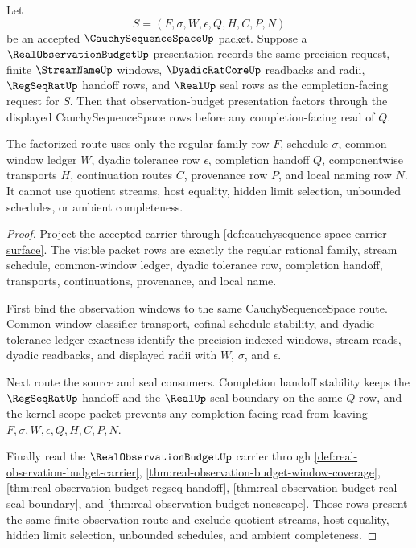 \begin{theorem}
\label{thm:cauchysequence-space-real-observation-budget-factorization}
Let
$$
S=(F,\sigma,W,\epsilon,Q,H,C,P,N)
$$
be an accepted $\CauchySequenceSpaceUp$ packet. Suppose a $\RealObservationBudgetUp$ presentation records the same precision request, finite $\StreamNameUp$ windows, $\DyadicRatCoreUp$ readbacks and radii, $\RegSeqRatUp$ handoff rows, and $\RealUp$ seal rows as the completion-facing request for $S$. Then that observation-budget presentation factors through the displayed CauchySequenceSpace rows before any completion-facing read of $Q$.

The factorized route uses only the regular-family row $F$, schedule $\sigma$, common-window ledger $W$, dyadic tolerance row $\epsilon$, completion handoff $Q$, componentwise transports $H$, continuation routes $C$, provenance row $P$, and local naming row $N$. It cannot use quotient streams, host equality, hidden limit selection, unbounded schedules, or ambient completeness.
\end{theorem}
\begin{proof}
Project the accepted carrier through \autoref{def:cauchysequence-space-carrier-surface}. The visible packet rows are exactly the regular rational family, stream schedule, common-window ledger, dyadic tolerance row, completion handoff, transports, continuations, provenance, and local name.

First bind the observation windows to the same CauchySequenceSpace route. Common-window classifier transport, cofinal schedule stability, and dyadic tolerance ledger exactness identify the precision-indexed windows, stream reads, dyadic readbacks, and displayed radii with $W$, $\sigma$, and $\epsilon$.

Next route the source and seal consumers. Completion handoff stability keeps the $\RegSeqRatUp$ handoff and the $\RealUp$ seal boundary on the same $Q$ row, and the kernel scope packet prevents any completion-facing read from leaving $F,\sigma,W,\epsilon,Q,H,C,P,N$.

Finally read the $\RealObservationBudgetUp$ carrier through \autoref{def:real-observation-budget-carrier}, \autoref{thm:real-observation-budget-window-coverage}, \autoref{thm:real-observation-budget-regseq-handoff}, \autoref{thm:real-observation-budget-real-seal-boundary}, and \autoref{thm:real-observation-budget-nonescape}. Those rows present the same finite observation route and exclude quotient streams, host equality, hidden limit selection, unbounded schedules, and ambient completeness.
\end{proof}

